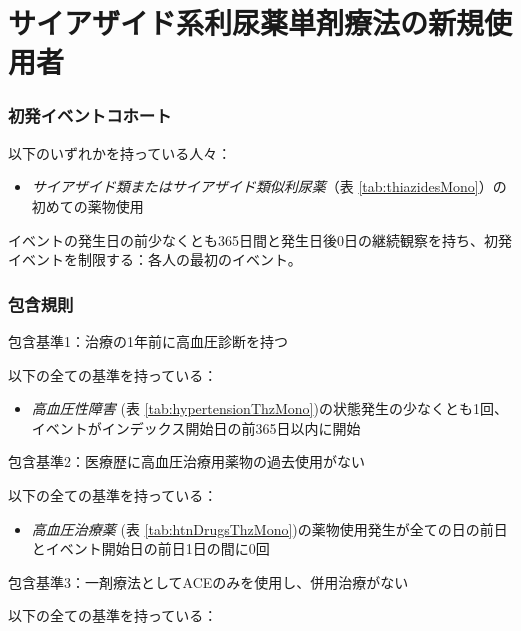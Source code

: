 \documentclass[
  11pt]{book}
\providecommand{\tightlist}{%
  \setlength{\itemsep}{0pt}\setlength{\parskip}{0pt}}
\theoremstyle{definition}
\theoremstyle{definition}
\theoremstyle{definition}
\theoremstyle{definition}
\theoremstyle{remark}
\begin{document}
\section{サイアザイド系利尿薬単剤療法の新規使用者}\label{ThiazidesMono}

\subsubsection*{初発イベントコホート}\label{ux521dux767aux30a4ux30d9ux30f3ux30c8ux30b3ux30dbux30fcux30c8-1}

以下のいずれかを持っている人々：

\begin{itemize}
\tightlist
\item
  \emph{サイアザイド類またはサイアザイド類似利尿薬}（表 \ref{tab:thiazidesMono}）の初めての薬物使用
\end{itemize}

イベントの発生日の前少なくとも365日間と発生日後0日の継続観察を持ち、初発イベントを制限する：各人の最初のイベント。

\subsubsection*{包含規則}\label{ux5305ux542bux898fux5247}

包含基準1：治療の1年前に高血圧診断を持つ

以下の全ての基準を持っている：

\begin{itemize}
\tightlist
\item
  \emph{高血圧性障害} (表 \ref{tab:hypertensionThzMono})の状態発生の少なくとも1回、イベントがインデックス開始日の前365日以内に開始
\end{itemize}

包含基準2：医療歴に高血圧治療用薬物の過去使用がない

以下の全ての基準を持っている：

\begin{itemize}
\tightlist
\item
  \emph{高血圧治療薬} (表 \ref{tab:htnDrugsThzMono})の薬物使用発生が全ての日の前日とイベント開始日の前日1日の間に0回
\end{itemize}

包含基準3：一剤療法としてACEのみを使用し、併用治療がない

以下の全ての基準を持っている：
\end{document}
